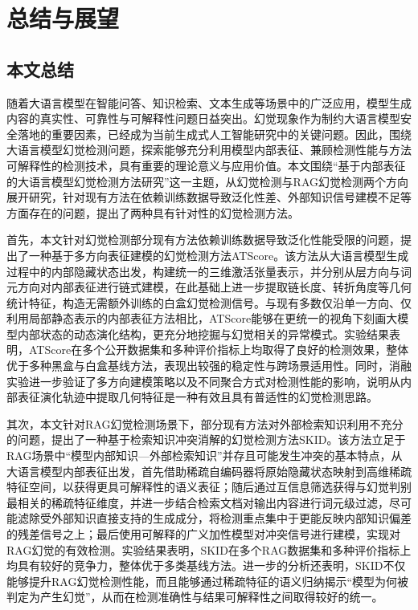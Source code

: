 \chapter{总结与展望}\label{chp:summary}

\section{本文总结}

随着大语言模型在智能问答、知识检索、文本生成等场景中的广泛应用，模型生成内容的真实性、可靠性与可解释性问题日益突出。幻觉现象作为制约大语言模型安全落地的重要因素，已经成为当前生成式人工智能研究中的关键问题。因此，围绕大语言模型幻觉检测问题，探索能够充分利用模型内部表征、兼顾检测性能与方法可解释性的检测技术，具有重要的理论意义与应用价值。本文围绕“基于内部表征的大语言模型幻觉检测方法研究”这一主题，从幻觉检测与RAG幻觉检测两个方向展开研究，针对现有方法在依赖训练数据导致泛化性差、外部知识信号建模不足等方面存在的问题，提出了两种具有针对性的幻觉检测方法。

首先，本文针对幻觉检测部分现有方法依赖训练数据导致泛化性能受限的问题，提出了一种基于多方向表征建模的幻觉检测方法ATScore。该方法从大语言模型生成过程中的内部隐藏状态出发，构建统一的三维激活张量表示，并分别从层方向与词元方向对内部表征进行链式建模，在此基础上进一步提取链长度、转折角度等几何统计特征，构造无需额外训练的白盒幻觉检测信号。与现有多数仅沿单一方向、仅利用局部静态表示的内部表征方法相比，ATScore能够在更统一的视角下刻画大模型内部状态的动态演化结构，更充分地挖掘与幻觉相关的异常模式。实验结果表明，ATScore在多个公开数据集和多种评价指标上均取得了良好的检测效果，整体优于多种黑盒与白盒基线方法，表现出较强的稳定性与跨场景适用性。同时，消融实验进一步验证了多方向建模策略以及不同聚合方式对检测性能的影响，说明从内部表征演化轨迹中提取几何特征是一种有效且具有普适性的幻觉检测思路。

其次，本文针对RAG幻觉检测场景下，部分现有方法对外部检索知识利用不充分的问题，提出了一种基于检索知识冲突消解的幻觉检测方法SKID。该方法立足于RAG场景中“模型内部知识—外部检索知识”并存且可能发生冲突的基本特点，从大语言模型内部表征出发，首先借助稀疏自编码器将原始隐藏状态映射到高维稀疏特征空间，以获得更具可解释性的语义表征；随后通过互信息筛选获得与幻觉判别最相关的稀疏特征维度，并进一步结合检索文档对输出内容进行词元级过滤，尽可能滤除受外部知识直接支持的生成成分，将检测重点集中于更能反映内部知识偏差的残差信号之上；最后使用可解释的广义加性模型对冲突信号进行建模，实现对RAG幻觉的有效检测。实验结果表明，SKID在多个RAG数据集和多种评价指标上均具有较好的竞争力，整体优于多类基线方法。进一步的分析还表明，SKID不仅能够提升RAG幻觉检测性能，而且能够通过稀疏特征的语义归纳揭示“模型为何被判定为产生幻觉”，从而在检测准确性与结果可解释性之间取得较好的统一。

